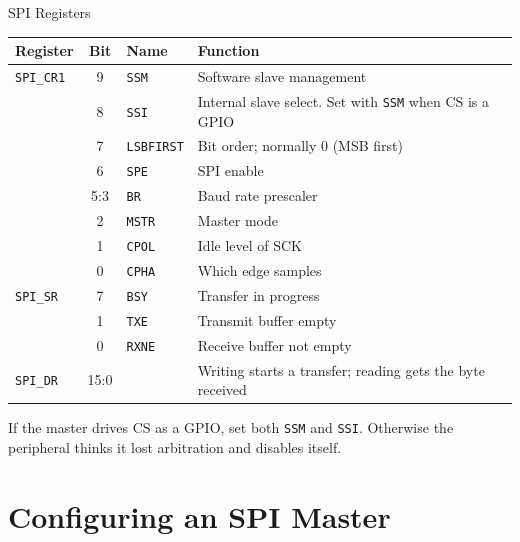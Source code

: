 \documentclass[9pt,aspectratio=169,xcolor=table]{beamer}
\begin{document}
\begin{frame}{SPI Registers}
    \begin{center}
    {\small
    \striped
    \begin{tabular}{@{}l c l R{.42\textwidth}@{}}
        \toprule
        \textbf{Register} & \textbf{Bit} & \textbf{Name} & \textbf{Function} \\
        \midrule
        \texttt{SPI\_CR1} & 9   & \texttt{SSM}      & Software slave management \\
                          & 8   & \texttt{SSI}      & Internal slave select. Set with \texttt{SSM} when CS is a GPIO \\
                          & 7   & \texttt{LSBFIRST} & Bit order; normally 0 (MSB first) \\
                          & 6   & \texttt{SPE}      & SPI enable \\
                          & 5:3 & \texttt{BR}       & Baud rate prescaler \\
                          & 2   & \texttt{MSTR}     & Master mode \\
                          & 1   & \texttt{CPOL}     & Idle level of SCK \\
                          & 0   & \texttt{CPHA}     & Which edge samples \\
        \texttt{SPI\_SR}  & 7   & \texttt{BSY}      & Transfer in progress \\
                          & 1   & \texttt{TXE}      & Transmit buffer empty \\
                          & 0   & \texttt{RXNE}     & Receive buffer not empty \\
        \texttt{SPI\_DR}  & 15:0 &                  & Writing starts a transfer; reading gets the byte received \\
        \bottomrule
    \end{tabular}}
    \end{center}

    \vspace{1mm}
    {\small If the master drives CS as a GPIO, set \alert{both} \texttt{SSM} and \texttt{SSI}. Otherwise the peripheral thinks it lost arbitration and disables itself.}
\end{frame}


\section{Configuring an SPI Master}
\end{document}
